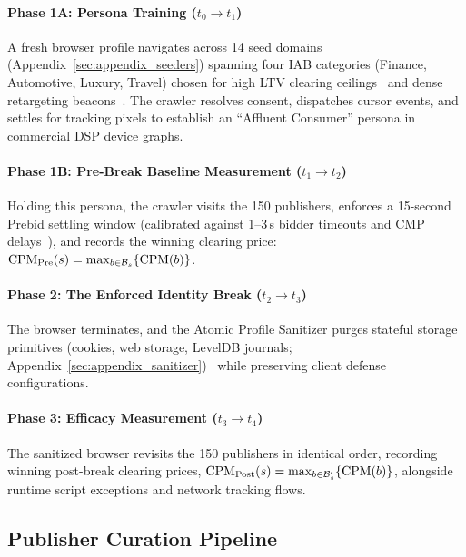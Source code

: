 \paragraph{Phase 1A: Persona Training ($t_0 \to t_1$)}
A fresh browser profile navigates across 14 seed domains (Appendix~\ref{sec:appendix_seeders}) spanning four IAB categories (Finance, Automotive, Luxury, Travel) chosen for high LTV clearing ceilings~\cite{beales2014empirical, barysei2023investigating} and dense retargeting beacons~\cite{oh2022cart, bashir2016tracing}. 
The crawler resolves consent, dispatches cursor events, and settles for tracking pixels to establish an ``Affluent Consumer'' persona in commercial DSP device graphs.

\paragraph{Phase 1B: Pre-Break Baseline Measurement ($t_1 \to t_2$)}
Holding this persona, the crawler visits the 150 publishers, enforces a 15-second Prebid settling window (calibrated against 1--3\,s bidder timeouts and CMP delays~\cite{pachilakis2019no, papadogiannakis2021user, cook2020inferring}), and records the winning clearing price: $\text{CPM}_{\text{Pre}}(s) = \max_{b \in \mathcal{B}_s} \{\text{CPM}(b)\}$.

\paragraph{Phase 2: The Enforced Identity Break ($t_2 \to t_3$)}
The browser terminates, and the Atomic Profile Sanitizer purges stateful storage primitives (cookies, web storage, LevelDB journals; Appendix~\ref{sec:appendix_sanitizer})~\cite{whatwg_webstorage, acar2014web} while preserving client defense configurations.

\paragraph{Phase 3: Efficacy Measurement ($t_3 \to t_4$)}
The sanitized browser revisits the 150 publishers in identical order, recording winning post-break clearing prices, $\text{CPM}_{\text{Post}}(s) = \max_{b \in \mathcal{B}_s'} \{\text{CPM}(b)\}$, alongside runtime script exceptions and network tracking flows.

\subsection{Publisher Curation Pipeline}
\label{subsec:curation}

